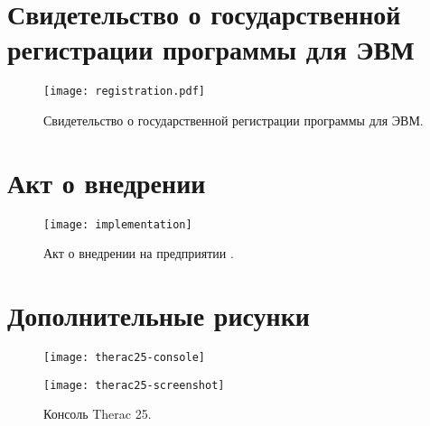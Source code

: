 \chapter{Свидетельство о государственной регистрации программы для ЭВМ}\label{app:sec:registration}
\begin{figure}[hb]\begin{center}
    \texttt{[image: registration.pdf]}
    \caption[Свидетельство о государственной регистрации]
        {Свидетельство о государственной регистрации программы для ЭВМ.}\label{app:fig:registration}
\end{center}\end{figure}


\chapter{Акт о внедрении}\label{app:sec:implementation}
\begin{figure}[hb]\begin{center}
    \texttt{[image: implementation]}
    \caption[Акт о внедрении]{Акт о внедрении на предприятии \leadingOrganizationTitle.}\label{app:fig:implementation}
\end{center}\end{figure}


\chapter{Дополнительные рисунки}\label{app:sec:figures}
\begin{figure}[hb!]\begin{center}
    \texttt{[image: therac25-console]}
    \caption[Therac 25]{Therac 25. Консоль оператора показана на рисунке \ref{app:fig:therac25_console}.}
        \label{app:fig:therac25}
    \vspace{10mm}
    \texttt{[image: therac25-screenshot]}
    \caption[Консоль Therac 25]{Консоль Therac 25.}\label{app:fig:therac25_console}
\end{center}\end{figure}

